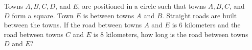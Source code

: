 Towns $A,B,C,D$, and $E$, are positioned in a circle such that towns $A,B,C$, and $D$ form a square. Town $E$ is between towns $A$ and $B$. Straight roads are built between the towns. If the road between towns $A$ and $E$ is $6$ kilometers and the road between towns $C$ and $E$ is $8$ kilometers, how long is the road between towns $D$ and $E$?
